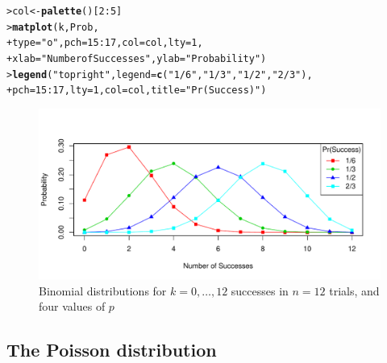 \documentclass[10pt,krantz2]{krantz}\usepackage[]{graphicx}\usepackage[]{color}
\makeatletter
\newcommand{\hlnum}[1]{\textcolor[rgb]{0.686,0.059,0.569}{#1}}%
\newcommand{\hlstr}[1]{\textcolor[rgb]{0.192,0.494,0.8}{#1}}%
\newcommand{\hlopt}[1]{\textcolor[rgb]{0,0,0}{#1}}%
\newcommand{\hlstd}[1]{\textcolor[rgb]{0.345,0.345,0.345}{#1}}%
\newcommand{\hlkwb}[1]{\textcolor[rgb]{0.69,0.353,0.396}{#1}}%
\newcommand{\hlkwc}[1]{\textcolor[rgb]{0.333,0.667,0.333}{#1}}%
\newcommand{\hlkwd}[1]{\textcolor[rgb]{0.737,0.353,0.396}{\textbf{#1}}}%
\newenvironment{kframe}{%
 \def\at@end@of@kframe{}%
 \ifinner\ifhmode%
  \def\at@end@of@kframe{\end{minipage}}%
  \begin{minipage}{\columnwidth}%
 \fi\fi%
 \def\FrameCommand##1{\hskip\@totalleftmargin \hskip-\fboxsep
 \colorbox{shadecolor}{##1}\hskip-\fboxsep
     \hskip-\linewidth \hskip-\@totalleftmargin \hskip\columnwidth}%
 \MakeFramed {\advance\hsize-\width
   \@totalleftmargin\z@ \linewidth\hsize
   \@setminipage}}%
 {\par\unskip\endMakeFramed%
 \at@end@of@kframe}
\newenvironment{knitrout}{}{} %
\renewenvironment{knitrout}{\small\renewcommand{\baselinestretch}{.85}}{} %
\makeatother
\begin{document}
\begin{knitrout}
\color{fgcolor}\begin{kframe}
\begin{alltt}
\hlstd{> }\hlstd{col} \hlkwb{<-} \hlkwd{palette}\hlstd{()[}\hlnum{2}\hlopt{:}\hlnum{5}\hlstd{]}
\hlstd{> }\hlkwd{matplot}\hlstd{(k, Prob,}
\hlstd{+ }        \hlkwc{type} \hlstd{=} \hlstr{"o"}\hlstd{,} \hlkwc{pch} \hlstd{=} \hlnum{15} \hlopt{:} \hlnum{17}\hlstd{,} \hlkwc{col} \hlstd{= col,} \hlkwc{lty} \hlstd{=} \hlnum{1}\hlstd{,}
\hlstd{+ }        \hlkwc{xlab} \hlstd{=} \hlstr{"Number of Successes"}\hlstd{,} \hlkwc{ylab} \hlstd{=} \hlstr{"Probability"}\hlstd{)}
\hlstd{> }\hlkwd{legend}\hlstd{(}\hlstr{"topright"}\hlstd{,} \hlkwc{legend} \hlstd{=} \hlkwd{c}\hlstd{(}\hlstr{"1/6"}\hlstd{,}\hlstr{"1/3"}\hlstd{,}\hlstr{"1/2"}\hlstd{,}\hlstr{"2/3"}\hlstd{),}
\hlstd{+ }       \hlkwc{pch} \hlstd{=} \hlnum{15} \hlopt{:} \hlnum{17}\hlstd{,} \hlkwc{lty} \hlstd{=} \hlnum{1}\hlstd{,} \hlkwc{col} \hlstd{= col,} \hlkwc{title} \hlstd{=} \hlstr{"Pr(Success)"}\hlstd{)}
\end{alltt}
\end{kframe}\begin{figure}[!htbp]

\centerline{\includegraphics[width=.75\textwidth]{ch03/fig/dbinom2-plot2-1} }

\caption[Binomial distributions for ]{Binomial distributions for $k=0, \dots, 12$ successes in $n=12$ trials, and four values of $p$\label{fig:dbinom2-plot2}}
\end{figure}


\end{knitrout}


\subsection{The Poisson distribution}\label{sec:poisson}
\end{document}
